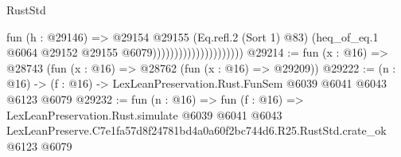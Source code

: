 \begin{lexlean}{RustStd}
\begin{coremodule}
                                          fun (h : @29146) =>
                                          @29154
                                            @29155
                                            (Eq.refl.{2} (Sort 1) @83)
                                            (heq_of_eq.{1}
                                              @6064
                                              @29152
                                              @29155
                                              @6079)))))))))))))))))))))
@29214 := fun (x : @16) => @28743 (fun (x : @16) => @28762 (fun (x : @16) => @29209))
@29222 := (n : @16) -> (f : @16) -> LexLeanPreservation.Rust.FunSem @6039 @6041 @6043 @6123 @6079
@29232 := fun (n : @16) =>
  fun (f : @16) =>
  LexLeanPreservation.Rust.simulate
    @6039
    @6041
    @6043
    LexLeanPreserve.C7e1fa57d8f24781bd4a0a60f2bc744d6.R25.RustStd.crate_ok
    @6123
    @6079
\end{coremodule}
\end{lexlean}
